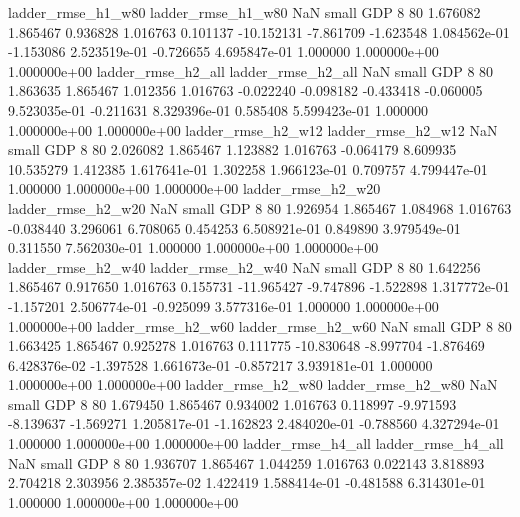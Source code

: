       ladder_rmse_h1_w80       ladder_rmse_h1_w80                   NaN      small      GDP                 8 80 1.676082       1.865467 0.936828       1.016763    0.101137    -10.152131     -7.861709    -1.623548   1.084562e-01 -1.153086 2.523519e-01    -0.726655   4.695847e-01            1.000000    1.000000e+00        1.000000e+00
      ladder_rmse_h2_all       ladder_rmse_h2_all                   NaN      small      GDP                 8 80 1.863635       1.865467 1.012356       1.016763   -0.022240     -0.098182     -0.433418    -0.060005   9.523035e-01 -0.211631 8.329396e-01     0.585408   5.599423e-01            1.000000    1.000000e+00        1.000000e+00
      ladder_rmse_h2_w12       ladder_rmse_h2_w12                   NaN      small      GDP                 8 80 2.026082       1.865467 1.123882       1.016763   -0.064179      8.609935     10.535279     1.412385   1.617641e-01  1.302258 1.966123e-01     0.709757   4.799447e-01            1.000000    1.000000e+00        1.000000e+00
      ladder_rmse_h2_w20       ladder_rmse_h2_w20                   NaN      small      GDP                 8 80 1.926954       1.865467 1.084968       1.016763   -0.038440      3.296061      6.708065     0.454253   6.508921e-01  0.849890 3.979549e-01     0.311550   7.562030e-01            1.000000    1.000000e+00        1.000000e+00
      ladder_rmse_h2_w40       ladder_rmse_h2_w40                   NaN      small      GDP                 8 80 1.642256       1.865467 0.917650       1.016763    0.155731    -11.965427     -9.747896    -1.522898   1.317772e-01 -1.157201 2.506774e-01    -0.925099   3.577316e-01            1.000000    1.000000e+00        1.000000e+00
      ladder_rmse_h2_w60       ladder_rmse_h2_w60                   NaN      small      GDP                 8 80 1.663425       1.865467 0.925278       1.016763    0.111775    -10.830648     -8.997704    -1.876469   6.428376e-02 -1.397528 1.661673e-01    -0.857217   3.939181e-01            1.000000    1.000000e+00        1.000000e+00
      ladder_rmse_h2_w80       ladder_rmse_h2_w80                   NaN      small      GDP                 8 80 1.679450       1.865467 0.934002       1.016763    0.118997     -9.971593     -8.139637    -1.569271   1.205817e-01 -1.162823 2.484020e-01    -0.788560   4.327294e-01            1.000000    1.000000e+00        1.000000e+00
      ladder_rmse_h4_all       ladder_rmse_h4_all                   NaN      small      GDP                 8 80 1.936707       1.865467 1.044259       1.016763    0.022143      3.818893      2.704218     2.303956   2.385357e-02  1.422419 1.588414e-01    -0.481588   6.314301e-01            1.000000    1.000000e+00        1.000000e+00
